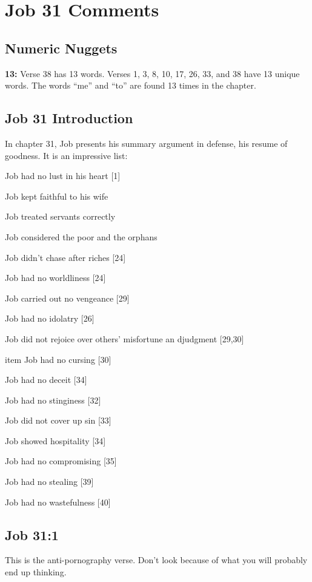 \section{Job 31  Comments}

\subsection{Numeric Nuggets}
\textbf{13:} Verse 38 has 13 words. Verses 1, 3, 8, 10, 17, 26, 33, and 38 have 13 unique words. The words ``me'' and ``to'' are found 13 times in the chapter.

\subsection{Job 31 Introduction}
In chapter 31, Job presents his summary argument in defense, his resume of goodness.  It is an impressive list: \cite{ruckman1993Job}
\begin{compactenum}
    \item Job had no lust in his heart [1]
    \item Job kept faithful to his wife
    \item Job treated servants correctly
    \item Job considered the poor and the orphans
    \item Job didn't chase after riches [24]
    \item Job had no worldliness [24]
    \item Job carried out no vengeance [29]
    \item Job had no idolatry [26]
    \item Job did not rejoice over others' misfortune an djudgment [29,30]
    \item item Job had no cursing [30]
    \item Job had no deceit [34]
    \item Job had no stinginess [32]
    \item Job did not cover up sin [33]
    \item Job showed hospitality [34]
    \item Job had no compromising [35]
    \item Job had no stealing [39]
    \item Job had no wastefulness [40]
\end{compactenum}



\subsection{Job 31:1}
This is the anti-pornography verse.  Don't look because of what you will probably end up thinking.\cite{thomas_20220119}
